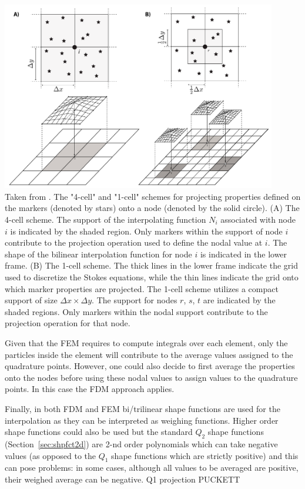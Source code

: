 \begin{center}
\includegraphics[width=12cm]{images/dumg11}\\
{\small Taken from \cite{dumg11}. The "4-cell" and "1-cell" schemes for projecting properties defined on the 
markers (denoted by stars) onto
a node (denoted by the solid circle). (A) The 4-cell scheme. The support of the interpolating function $N_i$ associated
with node $i$ is indicated by the shaded region. Only markers within the support of node $i$ contribute to the projection
operation used to define the nodal value at $i$. The shape of the bilinear interpolation function for node $i$ is indicated in
the lower frame. (B) The 1-cell scheme. The thick lines in the lower frame indicate the grid used to discretize the
Stokes equations, while the thin lines indicate the grid onto which marker properties are projected. The 1-cell scheme
utilizes a compact support of size $\Delta x \times  \Delta y$. The support for nodes $r$, $s$, $t$ are indicated by 
the shaded regions. Only
markers within the nodal support contribute to the projection operation for that node.}
\end{center}

Given that the FEM requires to compute integrals over each element, only the particles inside the element will contribute 
to the average values assigned to the quadrature points. However, one could also decide to first average the properties onto the nodes
before using these nodal values to assign values to the quadrature points. In this case the FDM approach applies. 

Finally, in both FDM and FEM bi/trilinear shape functions are used for the interpolation as they can be interpreted as weighing 
functions. Higher order shape functions could also be used but the standard $Q_2$ shape functions (Section~\ref{sec:shpfct2d})
are 2-nd order polynomials which can take negative values (as opposed to the $Q_1$ shape functions which are strictly positive)
and this can pose problems: in some cases, although all values to be averaged are positive, their weighed average can be negative.
Q1 projection PUCKETT

